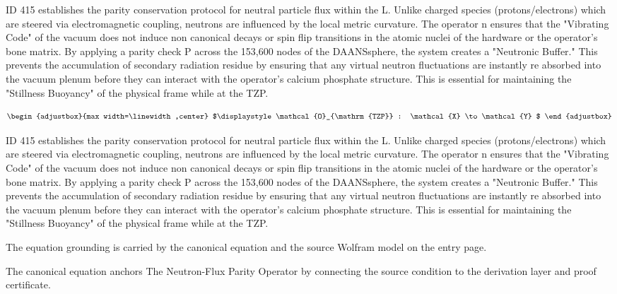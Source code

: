 ID 415 establishes the parity conservation protocol for neutral particle flux within the L. Unlike charged species (protons/electrons) which are steered via electromagnetic coupling, neutrons are influenced by the local metric curvature. The operator n ensures that the "Vibrating Code" of the vacuum does not induce non canonical decays or spin flip transitions in the atomic nuclei of the hardware or the operator's bone matrix. By applying a parity check P across the 153,600 nodes of the DAANSsphere, the system creates a "Neutronic Buffer." This prevents the accumulation of secondary radiation residue by ensuring that any virtual neutron fluctuations are instantly re absorbed into the vacuum plenum before they can interact with the operator's calcium phosphate structure. This is essential for maintaining the "Stillness Buoyancy" of the physical frame while at the TZP.

\[
\begin{adjustbox}{max width=\linewidth,center}
$\displaystyle
\mathcal{O}_{\mathrm{TZP}} : \mathcal{X} \to \mathcal{Y}
$
\end{adjustbox}
\]

ID 415 establishes the parity conservation protocol for neutral particle flux within the L. Unlike charged species (protons/electrons) which are steered via electromagnetic coupling, neutrons are influenced by the local metric curvature. The operator n ensures that the "Vibrating Code" of the vacuum does not induce non canonical decays or spin flip transitions in the atomic nuclei of the hardware or the operator's bone matrix. By applying a parity check P across the 153,600 nodes of the DAANSsphere, the system creates a "Neutronic Buffer." This prevents the accumulation of secondary radiation residue by ensuring that any virtual neutron fluctuations are instantly re absorbed into the vacuum plenum before they can interact with the operator's calcium phosphate structure. This is essential for maintaining the "Stillness Buoyancy" of the physical frame while at the TZP.

The equation grounding is carried by the canonical equation and the source Wolfram model on the entry page.

The canonical equation anchors The Neutron-Flux Parity Operator by connecting the source condition to the derivation layer and proof certificate.

